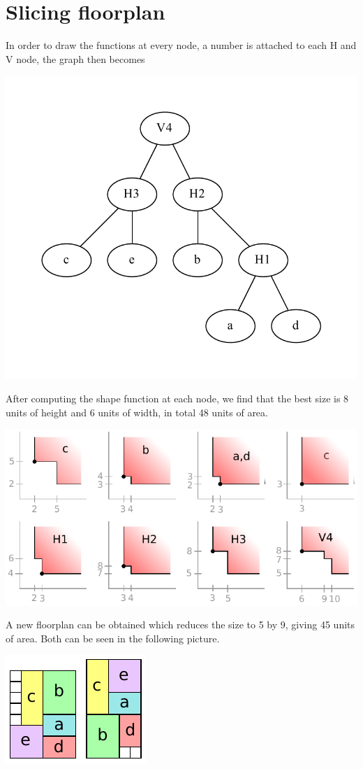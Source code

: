 \documentclass[a4paper]{article}
\begin{document}
\section{Slicing floorplan}

In order to draw the functions at every node, a number is attached to each H and 
V node, the graph then becomes
%
\begin{center}
\includegraphics[width=.5\textwidth]{floor-graph.pdf}
\end{center}
%
After computing the shape function at each node, we find that the best size is 
8 units of height and 6 units of width, in total 48 units of area.
%
\begin{center}
\includegraphics[width=.9\textwidth]{floorplan.pdf}
\end{center}
%
A new floorplan can be obtained which reduces the size to 5 by 9, giving 45 
units of area. Both can be seen in the following picture.
%
\begin{center}
\includegraphics[width=.4\textwidth]{plans.pdf}
\end{center}
%
\end{document}
